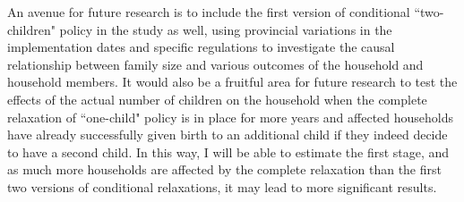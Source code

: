 \documentclass[12pt]{extarticle}
\begin{document}
\indent An avenue for future research is to include the first version of conditional ``two-children" policy in the study as well, using provincial variations in the implementation dates and specific regulations to investigate the causal relationship between family size and various outcomes of the household and household members. It would also be a fruitful area for future research to test the effects of the actual number of children on the household when the complete relaxation of ``one-child" policy is in place for more years and affected households have already successfully given birth to an additional child if they indeed decide to have a second child. In this way, I will be able to estimate the first stage, and as much more households are affected by the complete relaxation than the first two versions of conditional relaxations, it may lead to more significant results.
\end{document}
